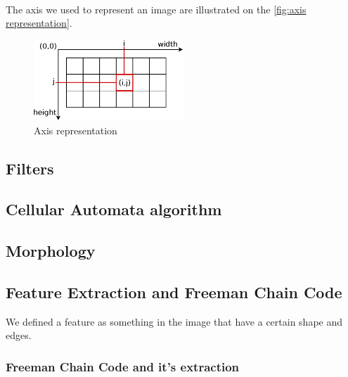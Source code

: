
~~

The axis we used to represent an image are illustrated on the \vref{fig:axis representation}. 

\begin{figure}[h]
	\centering
	\includegraphics[width=0.5\textwidth]{images/axis/axis_representation}
	\caption{Axis representation}
	\label{fig:axis representation}
\end{figure}






\subsection{Filters}

\subsection{Cellular Automata algorithm}

\subsection{Morphology}




\subsection{Feature Extraction and Freeman Chain Code}


We defined a feature as something in the image that have a certain shape and edges. 






\subsubsection{Freeman Chain Code and it's extraction}

